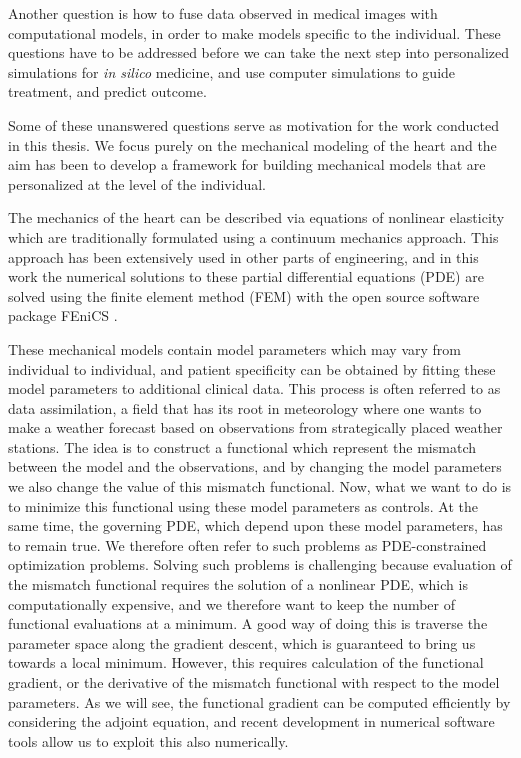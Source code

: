 Another question is how to fuse data observed in medical images with
computational models, in order to make models specific to the
individual. These questions have to be addressed before we can take the
next step into personalized simulations for \emph{in silico} medicine,
and use computer simulations to guide treatment, and predict outcome.



Some of these unanswered questions serve as motivation for the work
conducted in this thesis. We focus purely on the mechanical modeling
of the heart and the aim has been to develop a framework for
building mechanical models that are personalized at the level of the
individual.

The mechanics of the heart can be described via equations of nonlinear
elasticity which are traditionally formulated using a continuum
mechanics approach. This approach has been extensively used in other
parts of engineering, and in this work the numerical solutions to these partial
differential equations (PDE) are solved using the finite element
method (FEM) with the open source software package FEniCS \cite{logg2012automated}.

These mechanical models contain model parameters which may vary from
individual to individual, and patient specificity can be obtained by
fitting these model parameters to additional clinical data. This
process is often referred to as data assimilation, a field that has
its root in meteorology where one wants to make a weather forecast based
on observations from strategically placed weather stations. The idea
is to construct a functional which represent the mismatch between the
model and the observations, and by changing the model parameters we
also change the value of this mismatch functional. Now, what we want to do is to
minimize this functional using these model parameters as controls. At
the same time, the governing PDE, which depend upon these model
parameters, has to remain true. We therefore often
refer to such problems as PDE-constrained optimization problems.  
Solving such problems is challenging because evaluation of the
mismatch functional requires the solution of a nonlinear PDE, which is
computationally expensive, and we therefore want to keep the number of
functional evaluations at a minimum. A good way of doing this is
traverse the parameter space along the gradient descent, which is
guaranteed to bring us towards a local minimum. However, this requires
calculation of the functional gradient, or the derivative of the
mismatch functional with respect to the model parameters. As we will
see, the functional gradient can be computed efficiently by
considering the adjoint equation, and recent development in numerical
software tools \cite{farrell2013automated} allow us to exploit this
also numerically.


